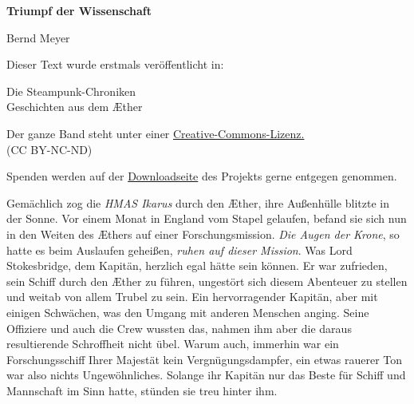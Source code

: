 \usepackage[ngerman]{babel}
\usepackage[T1]{fontenc}




\newcommand\bigpar\medskip


\raggedbottom
\begin{center}
\textbf{\huge\textsf{Triumpf der Wissenschaft}}

\medskip
Bernd Meyer

\end{center}

\bigskip
\begin{flushleft}
Dieser Text wurde erstmals veröffentlicht in:
\begin{center}
Die Steampunk-Chroniken\\
Geschichten aus dem Æther
\end{center}

\bigskip

Der ganze Band steht unter einer 
\href{http://creativecommons.org/licenses/by-nc-nd/2.0/de/}{Creative-Commons-Lizenz.} \\ 
(CC BY-NC-ND)

\bigskip

Spenden werden auf der 
\href{http://steampunk-chroniken.de/download}{Downloadseite}
des Projekts gerne entgegen genommen. 
\end{flushleft}

\newpage

Gemächlich zog die \emph{HMAS Ikarus} durch den Æther, ihre
Außenhülle blitzte in der Sonne. Vor einem Monat in England vom
Stapel gelaufen, befand sie sich nun in den Weiten des Æthers auf
einer Forschungsmission. \emph{Die Augen der Krone}, so hatte es
beim Auslaufen geheißen, \emph{ruhen auf dieser Mission}. Was Lord
Stokesbridge, dem Kapitän, herzlich egal hätte sein können. Er war
zufrieden, sein Schiff durch den Æther zu führen, ungestört sich
diesem Abenteuer zu stellen und weitab von allem Trubel zu sein.
Ein hervorragender Kapitän, aber mit einigen Schwächen, was den
Umgang mit anderen Menschen anging. Seine Offiziere und auch die
Crew wussten das, nahmen ihm aber die daraus resultierende
Schroffheit nicht übel. Warum auch, immerhin war ein
Forschungsschiff Ihrer Majestät kein Vergnügungsdampfer, ein etwas
rauerer Ton war also nichts Ungewöhnliches. Solange ihr Kapitän nur
das Beste für Schiff und Mannschaft im Sinn hatte, stünden sie treu
hinter ihm.

